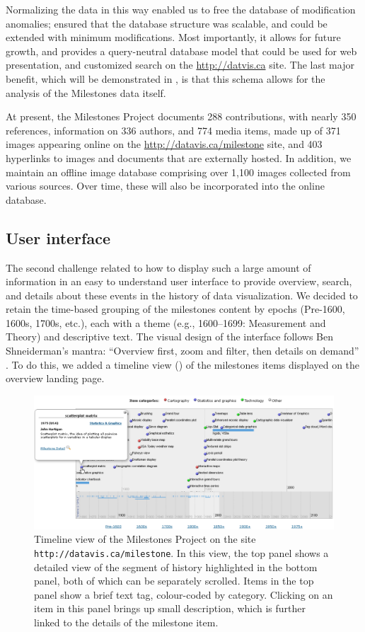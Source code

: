 Normalizing the data in this way enabled us to free the database of modification anomalies; ensured that the database structure was scalable, and could be extended with minimum modifications. Most importantly, it allows for future growth, and provides a query-neutral database model \citep{Codd:1971} that could be used for web presentation, and customized search on the \url{http://datvis.ca} site. The last major benefit, which will be demonstrated in , is that this schema allows for the analysis of the Milestones data itself.

At present, the Milestones Project documents 288 contributions, with nearly 350 references, information on 336 authors, and 774 media items, made up of 371 images appearing online on the \url{http://datavis.ca/milestone} site, and 403 hyperlinks to images and documents that are externally hosted. In addition, we maintain an offline image database comprising over 1,100 images collected from various sources. Over time, these will also be incorporated into the online database.

\subsection{User interface}
The second challenge related to how to display such a large amount of information in an easy to understand user interface to provide overview, search, and details about these events in the history of data visualization. We decided to retain the time-based grouping of the milestones content by epochs (Pre-1600, 1600s, 1700s, etc.), each with a theme (e.g., 1600--1699: Measurement and Theory) and descriptive text. The visual design of the interface follows Ben Shneiderman's mantra: ``Overview first, zoom and filter, then details on demand'' \citep{Shneiderman:1996:IEEE}. To do this, we added a timeline view () of the milestones items displayed on the overview landing page. 

\begin{figure}[!htb]
  \centering
  \includegraphics[width=\textwidth,clip]{fig/datavis-timeline2}
  \caption{Timeline view of the Milestones Project on the site \texttt{http://datavis.ca/milestone}. In this view, the top panel shows a detailed view of the segment of history highlighted in the bottom panel, both of which can be separately scrolled. Items in the top panel show a brief text tag, colour-coded by category. Clicking on an item in this panel brings up small description, which is further linked to the details of the milestone item.}
  \label{fig:datavis-timeline2}
\end{figure}


